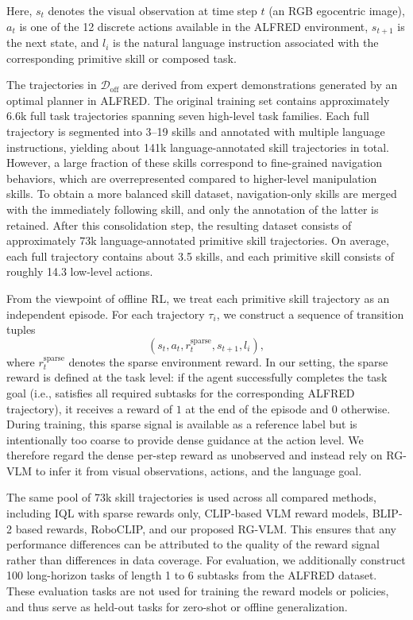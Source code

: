 \documentclass[master,english,final]{kaist-ucs}
\begin{document}
Here, $s_t$ denotes the visual observation at time step $t$ (an RGB egocentric image), $a_t$ is one of the 12 discrete actions available in the ALFRED environment, $s_{t+1}$ is the next state, and $l_i$ is the natural language instruction associated with the corresponding primitive skill or composed task.

The trajectories in $\mathcal{D}_{\text{off}}$ are derived from expert demonstrations generated by an optimal planner in ALFRED\cite{shridhar2020alfred}. The original training set contains approximately 6.6k full task trajectories spanning seven high-level task families. Each full trajectory is segmented into 3--19 skills and annotated with multiple language instructions, yielding about 141k language-annotated skill trajectories in total\cite{srivastava2022sprint}. However, a large fraction of these skills correspond to fine-grained navigation behaviors, which are overrepresented compared to higher-level manipulation skills. To obtain a more balanced skill dataset, navigation-only skills are merged with the immediately following skill, and only the annotation of the latter is retained. After this consolidation step, the resulting dataset consists of approximately 73k language-annotated primitive skill trajectories. On average, each full trajectory contains about 3.5 skills, and each primitive skill consists of roughly 14.3 low-level actions.

From the viewpoint of offline RL, we treat each primitive skill trajectory as an independent episode. For each trajectory $\tau_i$, we construct a sequence of transition tuples
\begin{equation}
    (s_t, a_t, r^{\text{sparse}}_t, s_{t+1}, l_i),
\end{equation}
where $r^{\text{sparse}}_t$ denotes the sparse environment reward. In our setting, the sparse reward is defined at the task level: if the agent successfully completes the task goal (i.e., satisfies all required subtasks for the corresponding ALFRED trajectory), it receives a reward of $1$ at the end of the episode and $0$ otherwise. During training, this sparse signal is available as a reference label but is intentionally too coarse to provide dense guidance at the action level. We therefore regard the dense per-step reward as unobserved and instead rely on RG-VLM to infer it from visual observations, actions, and the language goal.

The same pool of 73k skill trajectories is used across all compared methods, including IQL with sparse rewards only, CLIP-based VLM reward models\cite{rocamonde2023vision}, BLIP-2\cite{li2022blip} based rewards, RoboCLIP\cite{sontakke2024roboclip}, and our proposed RG-VLM. This ensures that any performance differences can be attributed to the quality of the reward signal rather than differences in data coverage. For evaluation, we additionally construct 100 long-horizon tasks of length 1 to 6 subtasks from the ALFRED dataset. These evaluation tasks are not used for training the reward models or policies, and thus serve as held-out tasks for zero-shot or offline generalization.
\end{document}
